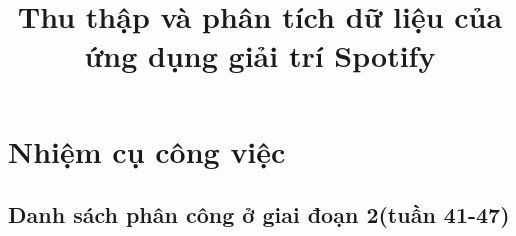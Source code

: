 \documentclass{../hcmut-report}
\title{Thu thập và phân tích dữ liệu của ứng dụng giải trí Spotify}
\begin{document}
\coverpage

\tableofcontents
\clearpage

\renewcommand{\listtablename}{DANH MỤC BẢNG}
\listoftables
\clearpage

\listoffigures
\clearpage



\section*{Nhiệm cụ công việc}



\subsection*{Danh sách phân công ở giai đoạn 2(tuần 41-47)}
\renewcommand{\arraystretch}{1.3} %
\setlength{\tabcolsep}{8pt} %
\end{document}
